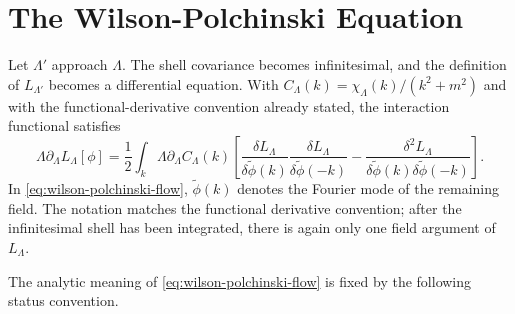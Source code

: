 \section{The Wilson-Polchinski Equation}

Let \(\Lambda'\) approach \(\Lambda\).  The shell covariance becomes
infinitesimal, and the definition of \(L_{\Lambda'}\) becomes a differential
equation.  With \(C_\Lambda(k)=\chi_\Lambda(k)/(k^2+m^2)\) and with the
functional-derivative convention already stated, the interaction functional
satisfies
\begin{equation}
  \Lambda\partial_\Lambda L_\Lambda[\phi]
  =
  \frac12\int_k
  \Lambda\partial_\Lambda C_\Lambda(k)
  \left[
    \frac{\delta L_\Lambda}{\delta\widetilde\phi(k)}
    \frac{\delta L_\Lambda}{\delta\widetilde\phi(-k)}
    -
    \frac{\delta^2 L_\Lambda}
      {\delta\widetilde\phi(k)\delta\widetilde\phi(-k)}
  \right].
  \label{eq:wilson-polchinski-flow}
\end{equation}
In \eqref{eq:wilson-polchinski-flow}, \(\widetilde\phi(k)\) denotes the Fourier
mode of the remaining field.  The notation matches the functional derivative
convention; after the infinitesimal shell has been integrated, there is again
only one field argument of \(L_\Lambda\).

The analytic meaning of \eqref{eq:wilson-polchinski-flow} is fixed by the
following status convention.

